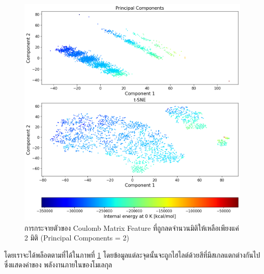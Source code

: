 \begin{figure}[H]
    \centering
    \includegraphics[width=\linewidth]{fig/cm_pca_tsne.png}
    \caption{การกระจายตัวของ Coulomb Matrix Feature ที่ถูกลดจำนวนมิติให้เหลือเพียงแค่ 2 มิติ (Principal Components = 2)}
    \label{fig:cm_pca_tsne}
\end{figure}

โดยเราจะได้พล็อตตามที่ได้ในภาพที่ \ref{fig:cm_pca_tsne} โดยข้อมูลแต่ละจุดนั้นจะถูกไฮไลต์ด้วยสีที่มีสเกลแตกต่างกันไปซึ่งแสดงค่าของ%
พลังงานภายในของโมเลกุล
